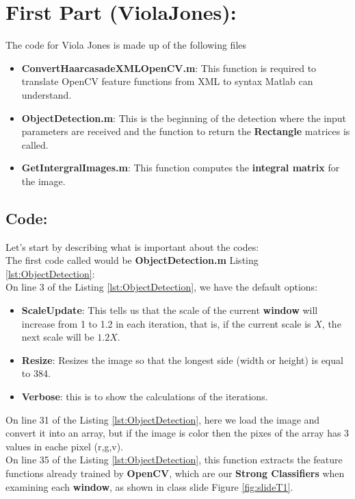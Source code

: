 \section{First Part (ViolaJones):}
The code for Viola Jones is made up of the following files
\begin{itemize}
	\item \textbf{ConvertHaarcasadeXMLOpenCV.m}: This function is required to translate OpenCV feature functions from XML to syntax Matlab can understand.
	\item \textbf{ObjectDetection.m}: This is the beginning of the detection where the input parameters are received and the function to return the \textbf{Rectangle} matrices is called. 	
	\item \textbf{GetIntergralImages.m}: This function computes the \textbf{integral matrix} for the image.
\end{itemize}

\subsection{Code:}
\noindent Let's start by describing what is important about the codes:\\
\noindent The first code called would be \textbf{ObjectDetection.m} Listing \ref{lst:ObjectDetection}:\\
\noindent On line 3 of the Listing \ref{lst:ObjectDetection}, we have the default options:
\begin{itemize}
	\item \textbf{ScaleUpdate}: This tells us that the scale of the current \textbf{window} will increase from 1 to 1.2 in each iteration, that is, if the current scale is $X$, the next scale will be $1.2X$. 
	\item \textbf{Resize}: Resizes the image so that the longest side (width or height) is equal to 384.
	\item \textbf{Verbose}: this is to show the calculations of the iterations.
\end{itemize}

\noindent On line 31 of the Listing \ref{lst:ObjectDetection}, here we load the image and convert it into an array, but if the image is color then the pixes of the array has 3 values in eache pixel (r,g,v).\\

\noindent On line 35 of the Listing \ref{lst:ObjectDetection}, this function extracts the feature functions already trained by \textbf{OpenCV}, which are our \textbf{Strong Classifiers} when examining each \textbf{window}, as shown in class slide Figure \ref{fig:slideT1}.\\

